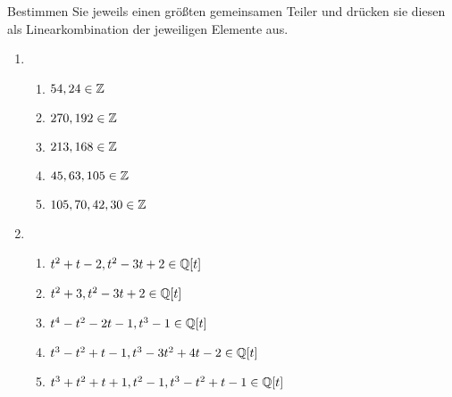 \begin{question}[subtitle = Größte gemeinsame Teiler]
  Bestimmen Sie jeweils einen größten gemeinsamen Teiler und drücken sie diesen als Linearkombination der jeweiligen Elemente aus.
  \begin{enumerate}
    \item
      \begin{enumerate}
        \item
          $54, 24 \in \mathbb{Z}$
        \item
          $270, 192 \in \mathbb{Z}$
        \item
          $213, 168 \in \mathbb{Z}$
        \item
          $45, 63, 105 \in \mathbb{Z}$
        \item
          $105, 70, 42, 30 \in \mathbb{Z}$
      \end{enumerate}
    \item
      \begin{enumerate}
        \item
          $t^2 + t - 2, t^2 - 3 t + 2 \in \mathbb{Q}[t]$
        \item
          $t^2 + 3, t^2 - 3 t + 2 \in \mathbb{Q}[t]$
        \item
          $t^4 - t^2 - 2 t - 1, t^3 - 1 \in \mathbb{Q}[t]$
        \item
          $t^3 - t^2 + t - 1, t^3 - 3 t^2 + 4 t - 2 \in \mathbb{Q}[t]$
        \item
          $t^3 + t^2 + t + 1, t^2 - 1, t^3 - t^2 + t - 1 \in \mathbb{Q}[t]$
      \end{enumerate}
  \end{enumerate}
\end{question}

